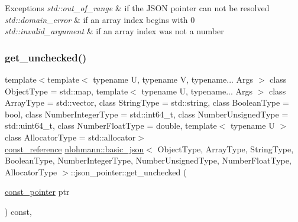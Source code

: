 \begin{DoxyExceptions}{Exceptions}
{\em std\+::out\+\_\+of\+\_\+range} & if the J\+S\+ON pointer can not be resolved \\
\hline
{\em std\+::domain\+\_\+error} & if an array index begins with \textquotesingle{}0\textquotesingle{} \\
\hline
{\em std\+::invalid\+\_\+argument} & if an array index was not a number \\
\hline
\end{DoxyExceptions}
\hypertarget{classnlohmann_1_1basic__json_1_1json__pointer_a158ef7fdb19b47d4188e8a941677574e}{}\label{classnlohmann_1_1basic__json_1_1json__pointer_a158ef7fdb19b47d4188e8a941677574e} 
\subsubsection{\texorpdfstring{get\+\_\+unchecked()}{get\_unchecked()}\hspace{0.1cm}{\footnotesize\ttfamily [2/2]}}
{\footnotesize\ttfamily template$<$template$<$ typename U, typename V, typename... Args $>$ class Object\+Type = std\+::map, template$<$ typename U, typename... Args $>$ class Array\+Type = std\+::vector, class String\+Type  = std\+::string, class Boolean\+Type  = bool, class Number\+Integer\+Type  = std\+::int64\+\_\+t, class Number\+Unsigned\+Type  = std\+::uint64\+\_\+t, class Number\+Float\+Type  = double, template$<$ typename U $>$ class Allocator\+Type = std\+::allocator$>$ \\
\hyperlink{classnlohmann_1_1basic__json_af677a29b0e66edc9f66e5167e4667071}{const\+\_\+reference} \hyperlink{classnlohmann_1_1basic__json}{nlohmann\+::basic\+\_\+json}$<$ Object\+Type, Array\+Type, String\+Type, Boolean\+Type, Number\+Integer\+Type, Number\+Unsigned\+Type, Number\+Float\+Type, Allocator\+Type $>$\+::json\+\_\+pointer\+::get\+\_\+unchecked (\begin{DoxyParamCaption}\item[{\hyperlink{classnlohmann_1_1basic__json_a06efb200b69942eacd1ea22d0f6ccebb}{const\+\_\+pointer}}]{ptr }\end{DoxyParamCaption}) const\hspace{0.3cm}{\ttfamily [inline]}, {\ttfamily [private]}}



